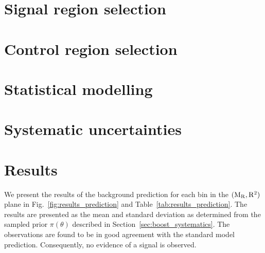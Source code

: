


\section{Signal region selection \label{sec:boost_signal_selection}}



\section{Control region selection \label{sec:boost_control_selection}}

\section{Statistical modelling \label{sec:boost_likelihood}}




\section{Systematic uncertainties \label{sec:boost_systematics}}


\section{Results \label{sec:boost_results}}

We present the results of the background prediction for each bin in the $(\mathrm{M_R},\mathrm{R^2})$ plane in
Fig.~\ref{fig:results_prediction} and Table~\ref{tab:results_prediction}. The results are presented
as the mean and standard deviation as determined from the sampled prior $\pi(\theta)$
described in Section~\ref{sec:boost_systematics}.  
The observations are found to be in good agreement with the standard model prediction. Consequently,
no evidence of a signal is observed. 

